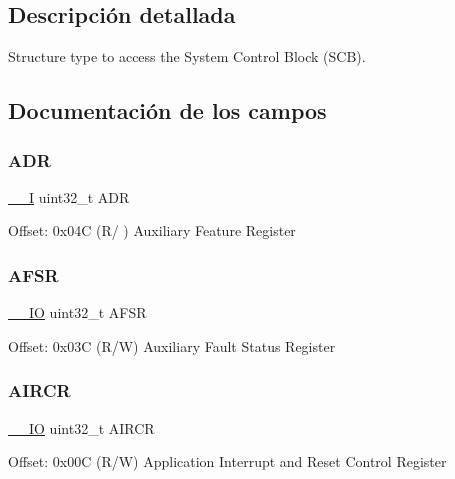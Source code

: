 \subsection{Descripción detallada}
Structure type to access the System Control Block (S\+CB). 

\subsection{Documentación de los campos}
\mbox{\label{struct_s_c_b___type_a5c0e2e1c7195d4dc09a5ca077c596318}} 
\subsubsection{\texorpdfstring{A\+DR}{ADR}}
{\footnotesize\ttfamily \mbox{\hyperlink{core__cm3_8h_af63697ed9952cc71e1225efe205f6cd3}{\+\_\+\+\_\+I}} uint32\+\_\+t A\+DR}

Offset\+: 0x04C (R/ ) Auxiliary Feature Register \mbox{\label{struct_s_c_b___type_ab9176079ea223dd8902589da91af63a2}} 
\subsubsection{\texorpdfstring{A\+F\+SR}{AFSR}}
{\footnotesize\ttfamily \mbox{\hyperlink{core__cm3_8h_aec43007d9998a0a0e01faede4133d6be}{\+\_\+\+\_\+\+IO}} uint32\+\_\+t A\+F\+SR}

Offset\+: 0x03C (R/W) Auxiliary Fault Status Register \mbox{\label{struct_s_c_b___type_aaec159b48828355cb770049b8b2e8d91}} 
\subsubsection{\texorpdfstring{A\+I\+R\+CR}{AIRCR}}
{\footnotesize\ttfamily \mbox{\hyperlink{core__cm3_8h_aec43007d9998a0a0e01faede4133d6be}{\+\_\+\+\_\+\+IO}} uint32\+\_\+t A\+I\+R\+CR}

Offset\+: 0x00C (R/W) Application Interrupt and Reset Control Register \mbox{\label{struct_s_c_b___type_ad49f99b1c83dcab356579af171bfa475}} 

